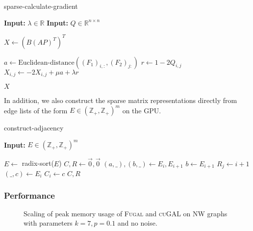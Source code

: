 \begin{algorithm}[H]
\caption{sparse-calculate-gradient}\label{alg:cugal-calculate-gradient}
\textbf{Input:} $\lambda \in \mathds{R}$
\textbf{Input:} $Q \in \mathds{R}^{n \times n}$
\begin{algorithmic}[1]
\State $X \gets (B (A P)^T)^T$ 

 
    \State $a \gets \text{Euclidean-distance}((F_1)_{i,:}, (F_2)_{j:})$
    \State $r \gets 1 - 2Q_{i, j}$
    \State $X_{i, j} \gets -2 X_{i, j} + \mu a + \lambda r$
\EndFor

\State \Return $X$
\end{algorithmic}
\end{algorithm}

In addition, we also construct the sparse matrix representations directly from edge lists of the form $E \in (\mathds{Z_+}, \mathds{Z_+})^m$ on the GPU.

\begin{algorithm}[H]
\caption{construct-adjacency}
\textbf{Input:} $E \in (\mathds{Z_+}, \mathds{Z_+})^m$
\begin{algorithmic}[1]
    \State $E \gets$ radix-sort($E$) 
    \State $C, R \gets \vec{0}, \vec{0}$
     
        \State $(a, \_), (b, \_) \gets E_i, E_{i + 1}$
        \State $b \gets E_{i + 1}$
            \State $R_j \gets i + 1$
        \EndFor
    \EndFor
     
        \State $(\_, c) \gets E_i$
        \State $C_i \gets c$
    \EndFor
    \State \Return $C, R$
\end{algorithmic}
\end{algorithm}

\subsubsection{Performance}
\mem

\begin{figure}[H]
    \centering
{}
    \caption{Scaling of peak memory usage of \textsc{Fugal} and \textsc{cuGAL} on NW graphs with parameters $k=7, p=0.1$ and no noise.}
    \label{fig:fugal-scaling}
\end{figure}

